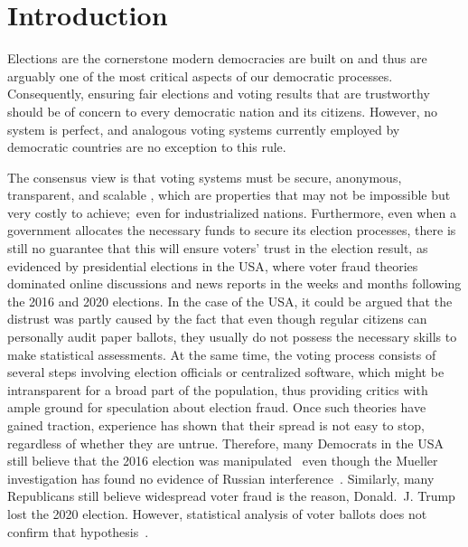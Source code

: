 \chapter{Introduction}\label{ch:intro}

Elections are the cornerstone modern democracies are built on and thus are arguably one of the most critical aspects of our democratic processes.
Consequently, ensuring fair elections and voting results that are trustworthy should be of concern to every democratic nation and its citizens.
However, no system is perfect, and analogous voting systems currently employed by democratic countries are no exception to this rule.

The consensus view is that voting systems must be secure, anonymous, transparent, and scalable
\autocites[9-11]{jafar_blockchain_2021}[3]{diaz-santiso_e-voting_2021}{lowry_desirable_2009}[10-12]{tas_systematic_2020},
which are properties that may not be impossible but very costly to achieve;\ even for industrialized nations.
Furthermore, even when a government allocates the necessary funds to secure its election processes, there is still no
guarantee that this will ensure voters’ trust in the election result, as evidenced by presidential elections in the \Gls{USA}, where voter fraud theories dominated online discussions and news reports in the weeks and months following the 2016 and 2020 elections.
In the case of the \Gls{USA}, it could be argued that the distrust was partly caused by the fact that even though regular citizens can personally audit paper ballots, they usually do not possess the necessary skills to make statistical assessments.
At the same time, the voting process consists of several steps involving election officials or centralized software, which might be intransparent for a broad part of the population, thus providing critics with ample ground for speculation about election fraud.
Once such theories have gained traction, experience has shown that their spread is not easy to stop, regardless of whether they are untrue.
Therefore, many Democrats in the \Gls{USA} still believe that the 2016 election was manipulated~\autocite{sinclair_its_2018}
even though the Mueller investigation has found no evidence of Russian interference~\autocite{mueller_report_2019}.
Similarly, many Republicans still believe widespread voter fraud is the reason, Donald.\ J. Trump lost the 2020 election.
However, statistical analysis of voter ballots does not confirm that hypothesis~\autocite{eggers_no_2021}.

